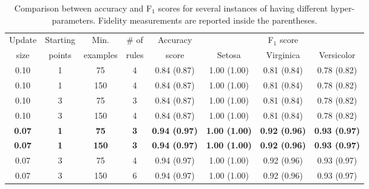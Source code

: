 
\begin{table}
	\caption{Comparison between accuracy and F$_1$ scores for several instances of \iter{} having different hyper-parameters. Fidelity measurements are reported inside the parentheses.}
	\begin{tabular}{c|c|c|c|c|ccc}
		\toprule
		Update & Starting & Min. & \# of & Accuracy & \multicolumn{3}{c}{F$_1$ score}\\
 		size & points & examples & rules & score & Setosa & Virginica & Versicolor \\
		\midrule
		0.10 & 1 & 75 & 4 & 0.84 (0.87) & 1.00 (1.00) & 0.81 (0.84) & 0.78 (0.82) \\
		0.10 & 1 & 150 & 4 & 0.84 (0.87) & 1.00 (1.00) & 0.81 (0.84) & 0.78 (0.82) \\
		0.10 & 3 & 75 & 3 & 0.84 (0.87) & 1.00 (1.00) & 0.81 (0.84) & 0.78 (0.82) \\
		0.10 & 3 & 150 & 4 & 0.84 (0.87) & 1.00 (1.00) & 0.81 (0.84) & 0.78 (0.82) \\
		\textbf{0.07} & \textbf{1} & \textbf{75} & \textbf{3} & \textbf{0.94 (0.97)} & \textbf{1.00 (1.00)} & \textbf{0.92 (0.96)} & \textbf{0.93 (0.97)} \\
		\textbf{0.07} & \textbf{1} & \textbf{150} & \textbf{3} & \textbf{0.94 (0.97)} & \textbf{1.00 (1.00)} & \textbf{0.92 (0.96)} & \textbf{0.93 (0.97)} \\
		0.07 & 3 & 75 & 4 & 0.94 (0.97) & 1.00 (1.00) & 0.92 (0.96) & 0.93 (0.97) \\
		0.07 & 3 & 150 & 6 & 0.94 (0.97) & 1.00 (1.00) & 0.92 (0.96) & 0.93 (0.97) \\
		\bottomrule
	\end{tabular}
\end{table}
